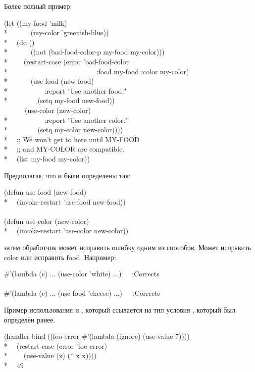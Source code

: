 \begin{defmac}
Более полный пример:
\begin{lisp}
(let ((my-food 'milk) \\*
~~~~~~(my-color 'greenish-blue)) \\*
~~(do () \\*
~~~~~~((not (bad-food-color-p my-food my-color))) \\*
~~~~(restart-case (error 'bad-food-color \\*
~~~~~~~~~~~~~~~~~~~~~~~~~:food my-food :color my-color) \\*
~~~~~~(use-food (new-food) \\*
~~~~~~~~~~:report "Use another food." \\*
~~~~~~~~(setq my-food new-food)) \\
~~~~~~(use-color (new-color) \\*
~~~~~~~~~~:report "Use another color." \\*
~~~~~~~~(setq my-color new-color)))) \\*
~~;; We won't get to here until MY-FOOD \\*
~~;; and MY-COLOR are compatible. \\*
~~(list my-food my-color))
\end{lisp}
Предполагая, что  и  были определены так:
\begin{lisp}
(defun use-food (new-food) \\*
~~(invoke-restart 'use-food new-food)) \\
\\
(defun use-color (new-color) \\*
~~(invoke-restart 'use-color new-color))
\end{lisp}
затем обработчик может исправить ошибку одним из способов. Может исправить color
или исправить food. Например:
\begin{lisp}
\#'(lambda (c) ... (use-color 'white) ...)~~~;\textrm{Corrects } \\
\\
\#'(lambda (c) ... (use-food 'cheese) ...)~~~;\textrm{Corrects }
\end{lisp}

Пример использования  и , который ссылается
на тип условия , который был определён ранее.
\begin{lisp}
(handler-bind ((foo-error \#'(lambda (ignore) (use-value 7)))) \\*
~~(restart-case (error 'foo-error) \\*
~~~~(use-value (x) (* x x)))) \\*
~\EV\ 49
\end{lisp}
\end{defmac}


